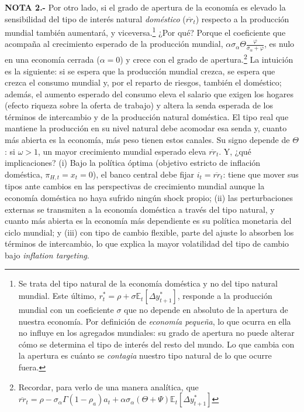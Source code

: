 \documentclass[10pt,a4paper]{article}
\begin{document}
\textbf{NOTA 2.-} Por otro lado, si el grado de apertura de la economía es elevado la sensibilidad del tipo de interés natural \textit{doméstico} ($\overline{rr}_t$) respecto a la producción mundial también aumentará, y viceversa.\footnote{%
Se trata del tipo natural de la economía doméstica y no del tipo natural mundial. Este último, $r_t^*=\rho+\sigma\mathbb E_t[\Delta y_{t+1}^*]$, responde a la producción mundial con un coeficiente $\sigma$ que no depende en absoluto de la apertura de nuestra economía. Por definición de \textit{economía pequeña}, lo que ocurra en ella no influye en los agregados mundiales: su grado de apertura no puede alterar cómo se determina el tipo de interés del resto del mundo. Lo que cambia con la apertura es cuánto se \textit{contagia} nuestro tipo natural de lo que ocurre fuera.
%
} ¿Por qué? Porque el coeficiente que acompaña al crecimiento esperado de la producción mundial, $\alpha\sigma_\alpha\Theta\frac{\varphi}{\sigma_\alpha+\varphi}$, es nulo en una economía cerrada ($\alpha=0$) y crece con el grado de apertura.\footnote{
  Recordar, para verlo de una manera analítica, que $\overline{rr}_t=\rho-\sigma_\alpha\Gamma(1-\rho_a)a_t+\alpha\sigma_\alpha(\Theta+\Psi)\mathbb E_t[\Delta y_{t+1}^*]$
} La intuición es la siguiente: si se espera que la producción mundial crezca, se espera que crezca el consumo mundial y, por el reparto de riesgos, también el doméstico; además, el aumento esperado del consumo eleva el salario que exigen los hogares (efecto riqueza sobre la oferta de trabajo) y altera la senda esperada de los términos de intercambio y de la producción natural doméstica. El tipo real que mantiene la producción en su nivel natural debe acomodar esa senda y, cuanto más abierta es la economía, más peso tienen estos canales. Su signo depende de $\Theta$: si $\omega>1$, un mayor crecimiento mundial esperado eleva $\overline{rr}_t$. Y, ¿qué implicaciones? (i) Bajo la política óptima (objetivo estricto de inflación doméstica, $\pi_{H,t}=x_t=0$), el banco central debe fijar $i_t=\overline{rr}_t$: tiene que mover sus tipos ante cambios en las perspectivas de crecimiento mundial aunque la economía doméstica no haya sufrido ningún shock propio; (ii) las perturbaciones externas se transmiten a la economía doméstica a través del tipo natural, y cuanto más abierta es la economía más dependiente es su política monetaria del ciclo mundial; y (iii) con tipo de cambio flexible, parte del ajuste lo absorben los términos de intercambio, lo que explica la mayor volatilidad del tipo de cambio bajo \textit{inflation targeting}.
\end{document}
